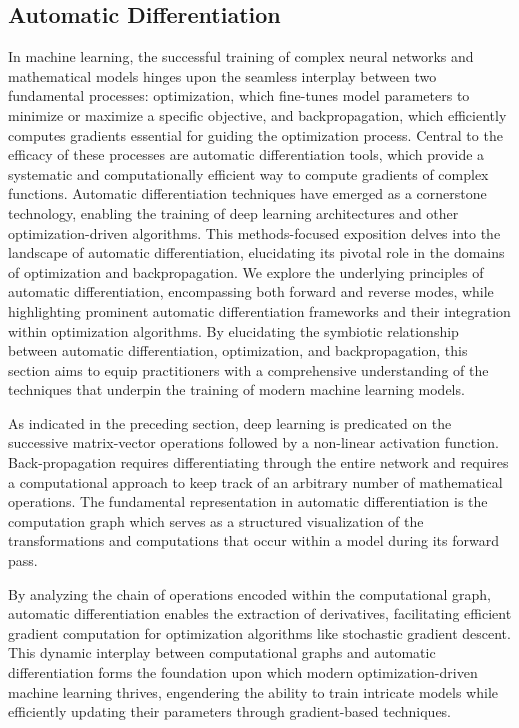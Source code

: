 \subsection{Automatic Differentiation}


In machine learning, the successful training of complex neural networks and mathematical models hinges upon the seamless interplay between two fundamental processes: optimization, which fine-tunes model parameters to minimize or maximize a specific objective, and backpropagation, which efficiently computes gradients essential for guiding the optimization process. Central to the efficacy of these processes are automatic differentiation tools, which provide a systematic and computationally efficient way to compute gradients of complex functions. Automatic differentiation techniques have emerged as a cornerstone technology, enabling the training of deep learning architectures and other optimization-driven algorithms. This methods-focused exposition delves into the landscape of automatic differentiation, elucidating its pivotal role in the domains of optimization and backpropagation. We explore the underlying principles of automatic differentiation, encompassing both forward and reverse modes, while highlighting prominent automatic differentiation frameworks and their integration within optimization algorithms. By elucidating the symbiotic relationship between automatic differentiation, optimization, and backpropagation, this section aims to equip practitioners with a comprehensive understanding of the techniques that underpin the training of modern machine learning models. 

As indicated in the preceding section, deep learning is predicated on the successive matrix-vector operations followed by a non-linear activation function. Back-propagation requires differentiating through the entire network and requires a computational approach to keep track of an arbitrary number of mathematical operations. The fundamental representation in automatic differentiation is the computation graph which serves as a structured visualization of the transformations and computations that occur within a model during its forward pass. 

By analyzing the chain of operations encoded within the computational graph, automatic differentiation enables the extraction of derivatives, facilitating efficient gradient computation for optimization algorithms like stochastic gradient descent. This dynamic interplay between computational graphs and automatic differentiation forms the foundation upon which modern optimization-driven machine learning thrives, engendering the ability to train intricate models while efficiently updating their parameters through gradient-based techniques.

\newpage